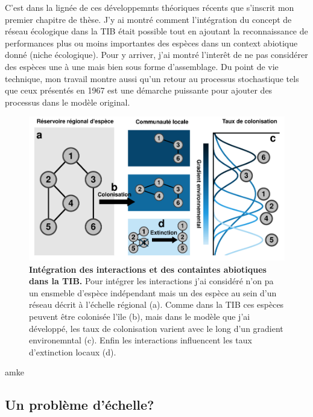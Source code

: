 C'est dans la lignée de ces développemnts théoriques récents que
s'inscrit mon premier chapitre de thèse. J'y ai montré comment
l'intégration du concept de réseau écologique dans la TIB était possible
tout en ajoutant la reconnaissance de performances plus ou moins
importantes des espèces dans un context abiotique donné (niche
écologique). Pour y arriver, j'ai montré l'interêt de ne pas considérer
des espèces une à une mais bien sous forme d'assemblage. Du point de vie
technique, mon travail montre aussi qu'un retour au processus
stochastique tels que ceux présentés en 1967 est une démarche puissante
pour ajouter des processus dans le modèle original.

\begin{figure}[htbp]
\centering
\includegraphics{fig/fig2.pdf}
\caption{\textbf{Intégration des interactions et des containtes
abiotiques dans la TIB.} Pour intégrer les interactions j'ai considéré
n'on pa un ensmeble d'espèce indépendant mais un des espèce au sein d'un
réseau décrit à l'échelle régional (a). Comme dans la TIB ces espèces
peuvent être colonisée l'île (b), mais dans le modèle que j'ai
développé, les taux de colonisation varient avec le long d'un gradient
environemntal (c). Enfin les interactions influencent les taux
d'extinction locaux (d).\label{fig:figGTIB}}
\end{figure}

amke

\subsection*{Un problème d'échelle?}\label{un-probluxe8me-duxe9chelle}

